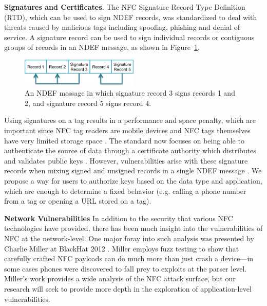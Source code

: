 \documentclass[12pt]{article}
\begin{document}
\textbf{Signatures and Certificates.}
The NFC Signature Record Type Definition (RTD), which can be used to sign NDEF records, was standardized to deal with threats caused by malicious tags including spoofing, phishing and denial of service.
A signature record can be used to sign individual records or contiguous groups of records in an NDEF message, as shown in Figure~\ref{fig:relatedwork:signature}.
\begin{figure}[h!]
\begin{minipage}{\textwidth}
	\centering
		\includegraphics[width=0.5\textwidth]{signed_ndef.png}
	\caption[Caption for LOF]%
  {An NDEF message in which signature record 3 signs records 1 and 2, and signature record 5 signs record 4.}
  \label{fig:relatedwork:signature}

\end{minipage} 
\end{figure}

Using signatures on a tag results in a performance and space penalty, which are important since NFC tag readers are mobile devices and NFC tags themselves have very limited storage space \cite{kilas2009}.
The standard now focuses on being able to authenticate the source of data through a certificate authority which distributes and validates public keys \cite{rosati2011}.
However, vulnerabilities arise with these signature records when mixing signed and unsigned records in a single NDEF message \cite{roland2010,roland2011}.
We propose a way for users to authorize keys based on the data type and application, which are enough to determine a fixed behavior (e.g. calling a phone number from a tag or opening a URL stored on a tag).

\textbf{Network Vulnerabilities}
In addition to the security that various NFC technologies have provided, there has been much insight into the vulnerabilities of NFC at the network-level. 
One major foray into such analysis was presented by Charlie Miller at BlackHat 2012 \cite{miller2012}.
Miller employs fuzz testing to show that carefully crafted NFC payloads can do much more than just crash a device---in some cases phones were discovered to fall prey to exploits at the parser level.
Miller's work provides a wide analysis of the NFC attack surface, but our research will seek to provide more depth in the exploration of application-level vulnerabilities.
\end{document}
